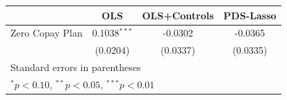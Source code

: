 {

\begin{tabular}{l*{3}{c}}
\toprule
                &\multicolumn{1}{c}{OLS}&\multicolumn{1}{c}{OLS+Controls}&\multicolumn{1}{c}{PDS-Lasso}\\
\midrule
Zero Copay Plan &   0.1038$^{***}$&  -0.0302         &  -0.0365         \\
                & (0.0204)         & (0.0337)         & (0.0335)         \\
\bottomrule
\multicolumn{4}{l}{\footnotesize Standard errors in parentheses}\\
\multicolumn{4}{l}{\footnotesize $^{*}p<0.10$, $^{**}p<0.05$, $^{***}p<0.01$}\\
\end{tabular}
}
